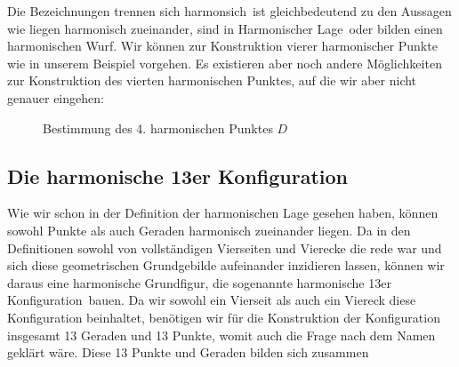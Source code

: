 \documentclass[12pt,a4paper]{article}
\begin{document}
Die Bezeichnungen \glqq trennen sich harmonsich\grqq ~ist gleichbedeutend zu den Aussagen wie \glqq liegen harmonisch zueinander\grqq , \glqq sind in Harmonischer Lage\grqq ~oder \glqq bilden einen harmonischen Wurf\grqq \citep[vgl.][S. 46]{projektiveGeometrie}.
\newline
\newline
Wir können zur Konstruktion vierer harmonischer Punkte wie in unserem Beispiel vorgehen. Es existieren aber noch andere Möglichkeiten zur Konstruktion des vierten harmonischen Punktes, auf die wir aber nicht genauer eingehen:

\begin{figure} [htbp]
 \hfill
{}
\caption{Bestimmung des 4. harmonischen Punktes $D$}
\end{figure} 

\newpage
\subsection{Die harmonische 13er Konfiguration}
\label{subsec:harmonischeKonfiguration}

Wie wir schon in der Definition der harmonischen Lage gesehen haben, können sowohl Punkte als auch Geraden harmonisch zueinander liegen. Da in den Definitionen sowohl von vollständigen Vierseiten und Vierecke die rede war und sich diese geometrischen Grundgebilde aufeinander inzidieren lassen, können wir daraus eine harmonische Grundfigur, die sogenannte \glqq harmonische 13er Konfiguration\grqq ~bauen. Da wir sowohl ein Vierseit als auch ein Viereck diese Konfiguration beinhaltet, benötigen wir für die Konstruktion der Konfiguration insgesamt 13 Geraden und 13 Punkte, womit auch die Frage nach dem Namen geklärt wäre. Diese 13 Punkte und Geraden bilden sich zusammen
\end{document}
